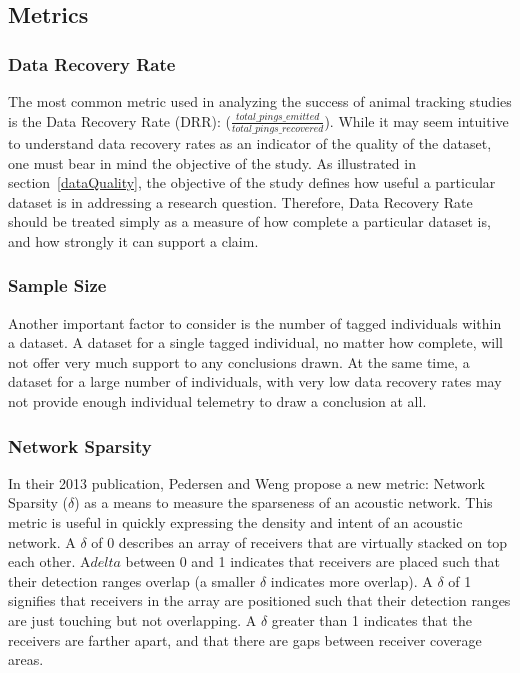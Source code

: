 \subsection{Metrics}
\subsubsection{Data Recovery Rate}
\label{DataRecoveryRate}
The most common metric used in analyzing the success of animal tracking studies is the Data Recovery Rate (DRR): ($\frac{total\_pings\_emitted}{total\_pings\_recovered}$).  While it may seem intuitive to understand data recovery rates as an indicator of the quality of the dataset, one must bear in mind the objective of the study.  As illustrated in section~\ref{dataQuality}, the objective of the study defines how useful a particular dataset is in addressing a research question.  Therefore, Data Recovery Rate should be treated simply as a measure of how complete a particular dataset is, and how strongly it can support a claim.  

\subsubsection{Sample Size}
\label{sampleSize}
Another important factor to consider is the number of tagged individuals within a dataset.  A dataset for a single tagged individual, no matter how complete, will not offer very much support to any conclusions drawn.  At the same time, a dataset for a large number of individuals, with very low data recovery rates may not provide enough individual telemetry to draw a conclusion at all.

\subsubsection{Network Sparsity}
\label{delta}
In their 2013 publication, Pedersen and Weng propose a new metric: Network Sparsity ($\delta$) as a means to measure the sparseness of an acoustic network.  This metric is useful in quickly expressing the density and intent of an acoustic network.  A $\delta$ of 0 describes an array of receivers that are virtually stacked on top each other.  A$delta$ between 0 and 1 indicates that receivers are placed such that their detection ranges overlap (a smaller $\delta$ indicates more overlap).  A $\delta$ of 1 signifies that receivers in the array are positioned such that their detection ranges are just touching but not overlapping.  A $\delta$ greater than 1 indicates that the receivers are farther apart, and that there are gaps between receiver coverage areas.  

